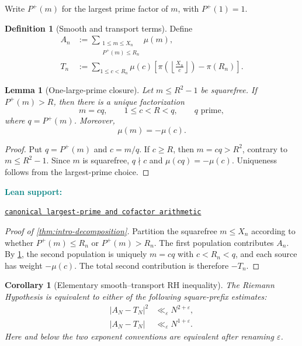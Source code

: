 \documentclass[11pt]{article}
\newtheorem{lemma}[theorem]{Lemma}
\newtheorem{corollary}[theorem]{Corollary}
\theoremstyle{definition}
\newtheorem{definition}[theorem]{Definition}
\newcommand{\eps}{\varepsilon}
\newcommand{\Pplus}{P^{+}}
\newcommand{\1}{\mathbf{1}}
\newcommand{\leanxref}[3]{%
  \par\smallskip
  {\small\noindent\textcolor{teal}{\textbf{#1:}}\par
  \noindent\href{#3}{\nolinkurl{#2}}\par}
  \smallskip
}
\begin{document}
Write $\Pplus(m)$ for the largest prime factor of $m$, with $\Pplus(1)=1$.

\begin{definition}[Smooth and transport terms]
\label{def:AT}
Define
\begin{align}
 A_n
 &:={\sum}_{\substack{1\le m\le X_n\\\Pplus(m)\le R_n}}\mu(m),
 \label{eq:An}\\
 T_n
 &:={\sum}_{1\le c<R_n}\mu(c)
 \left[
 \pi\!\left(\left\lfloor\frac{X_n}{c}\right\rfloor\right)-\pi(R_n)
 \right].
 \label{eq:Tn}
\end{align}
\end{definition}

\begin{lemma}[One-large-prime closure]
\label{lem:one-large}
Let $m\le R^2-1$ be squarefree.  If $\Pplus(m)>R$, then there is a unique factorization
\begin{equation}
 m=cq,
 \qquad
 1\le c<R<q,
 \qquad
 q\text{ prime},
 \label{eq:one-large}
\end{equation}
where $q=\Pplus(m)$.  Moreover,
\begin{equation}
 \mu(m)=-\mu(c).
 \label{eq:mobius-peel}
\end{equation}
\end{lemma}

\begin{proof}
Put $q=\Pplus(m)$ and $c=m/q$.  If $c\ge R$, then $m=cq>R^2$, contrary to $m\le R^2-1$.  Since $m$ is squarefree, $q\nmid c$ and $\mu(cq)=-\mu(c)$.  Uniqueness follows from the largest-prime choice.
\end{proof}
\leanxref{Lean support}{canonical largest-prime and cofactor arithmetic}{https://github.com/OVVO-Financial/square-block-mobius/blob/main/lean/RHLean/Analysis/CanonicalHighSectorCore.lean}

\begin{proof}[Proof of \cref{thm:intro-decomposition}]
Partition the squarefree $m\le X_n$ according to whether $\Pplus(m)\le R_n$ or $\Pplus(m)>R_n$.  The first population contributes $A_n$.  By \cref{lem:one-large}, the second population is uniquely $m=cq$ with $c<R_n<q$, and each source has weight $-\mu(c)$.  The total second contribution is therefore $-T_n$.
\end{proof}

\begin{corollary}[Elementary smooth--transport RH inequality]
\label{cor:elementary-AT-RH}
The Riemann Hypothesis is equivalent to either of the following square-prefix estimates:
\begin{align}
 |A_N-T_N|^2&\ll_\eps N^{2+\eps},
 \label{eq:elementary-AT-squared}\\
 |A_N-T_N|&\ll_\eps N^{1+\eps}.
 \label{eq:elementary-AT-linear}
\end{align}
Here and below the two exponent conventions are equivalent after renaming $\eps$.
\end{corollary}
\end{document}
